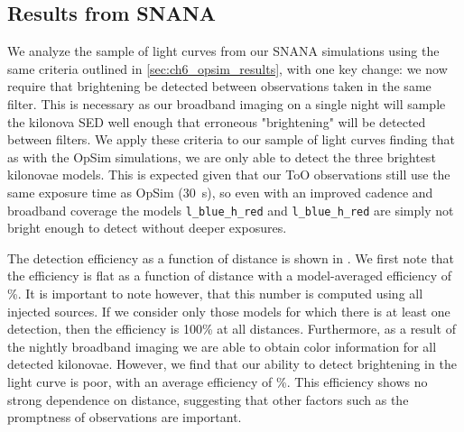 \subsection{Results from SNANA}
\label{sec:ch6_snana_results}
We analyze the sample of light curves from our SNANA simulations using the same criteria outlined in \cref{sec:ch6_opsim_results}, with one key change: we now require that brightening be detected between observations taken in the same filter. This is necessary as our broadband imaging on a single night will sample the kilonova SED well enough that erroneous "brightening" will be detected between filters. We apply these criteria to our sample of light curves finding that as with the OpSim simulations, we are only able to detect the three brightest kilonovae models. This is expected given that our ToO observations still use the same exposure time as OpSim (30~s), so even with an improved cadence and broadband coverage the models {\tt l\_blue\_h\_red} and {\tt l\_blue\_h\_red} are simply not bright enough to detect without deeper exposures.

The detection efficiency as a function of distance is shown in . We first note that the efficiency is flat as a function of distance with a model-averaged efficiency of \%. It is important to note however, that this number is computed using all injected sources. If we consider only those models for which there is at least one detection, then the efficiency is 100\% at all distances. Furthermore, as a result of the nightly broadband imaging we are able to obtain color information for all detected kilonovae. However, we find that our ability to detect brightening in the light curve is poor, with an average efficiency of \%. This efficiency shows no strong dependence on distance, suggesting that other factors such as the promptness of observations are important.


